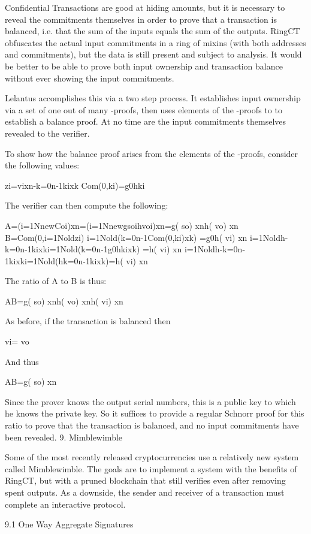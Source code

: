 \documentclass{article}
\begin{document}
Confidential Transactions are good at hiding amounts, but it is necessary to reveal the commitments themselves in order to prove that a transaction is balanced, i.e. that the sum of the inputs equals the sum of the outputs.  RingCT obfuscates the actual input commitments in a ring of mixins (with both addresses and commitments), but the data is still present and subject to analysis.  It would be better to be able to prove both input ownership and transaction balance without ever showing the input commitments.

Lelantus accomplishes this via a two step process.  It establishes input ownership via a set of one out of many -proofs, then uses elements of the -proofs to to establish a balance proof.  At no time are the input commitments themselves revealed to the verifier.

To show how the balance proof arises from the elements of the -proofs, consider the following values:

	zi=vixn-k=0n-1kixk
	Com(0,ki)=g0hki

The verifier can then compute the following:

	A=(i=1NnewCoi)xn=(i=1Nnewgsoihvoi)xn=g( so) xnh( vo) xn
	B=Com(0,i=1Noldzi) i=1Nold(k=0n-1Com(0,ki)xk)
	  =g0h( vi) xn i=1Noldh-k=0n-1kixki=1Nold(k=0n-1g0hkixk)
	  =h( vi) xn i=1Noldh-k=0n-1kixki=1Nold(hk=0n-1kixk)=h( vi) xn

The ratio of A to B is thus:

	AB=g( so) xnh( vo) xnh( vi) xn

As before, if the transaction is balanced then 

	 vi= vo

And thus

	AB=g( so) xn

Since the prover knows the output serial numbers, this is a public key to which he knows the private key.  So it suffices to provide a regular Schnorr proof for this ratio to prove that the transaction is balanced, and no input commitments have been revealed.
9. Mimblewimble

Some of the most recently released cryptocurrencies use a relatively new system called Mimblewimble.  The goals are to implement a system with the benefits of RingCT, but with a pruned blockchain that still verifies even after removing spent outputs.  As a downside, the sender and receiver of a transaction must complete an interactive protocol.


9.1 One Way Aggregate Signatures
\end{document}
